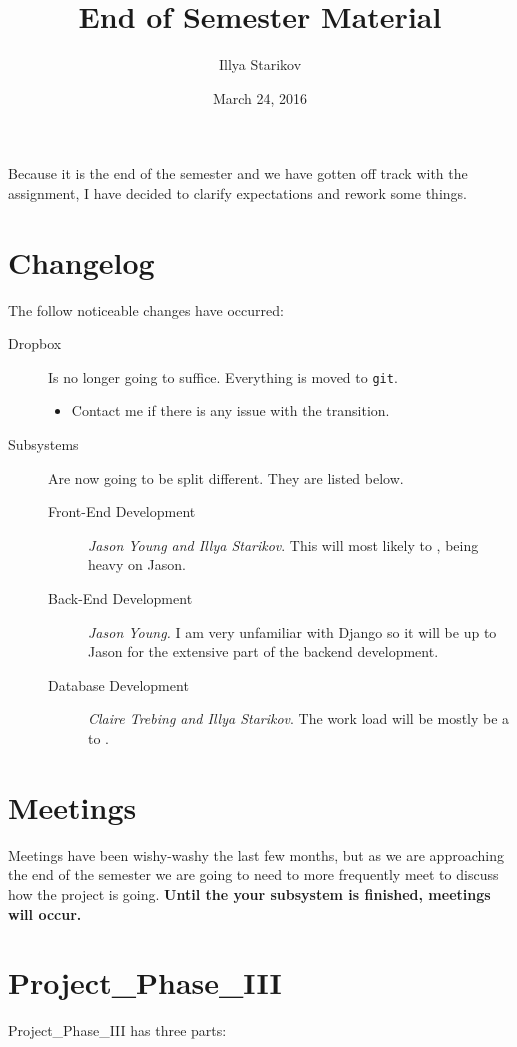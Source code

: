 \documentclass{scrartcl}
\title{End of Semester Material}
\author{Illya Starikov}
\date{March 24, 2016}
\newcommand{\shellcmd}[1]{\texttt{\colorbox{gray!30}{#1}}}
\begin{document}
\maketitle

Because it is the end of the semester and we have gotten off track with the assignment, I have decided to clarify expectations and rework some things.

\section{Changelog}
The follow noticeable changes have occurred:
\begin{description}
    \item [Dropbox] Is no longer going to suffice. Everything is moved to \shellcmd{git}.
    \begin{itemize}
        \item Contact me if there is any issue with the transition.
    \end{itemize}
    \item [Subsystems] Are now going to be split different. They are listed below.
    \begin{description}
        \item[Front-End Development] \textit{Jason Young and Illya Starikov}. This will most likely  to , being heavy on Jason.
        \item[Back-End Development] \textit{Jason Young.} I am very unfamiliar with Django so it will be up to Jason for the extensive part of the backend development.
        \item[Database Development] \textit{Claire Trebing and Illya Starikov}. The work load will be mostly be a  to .
    \end{description}
\end{description}

\section{Meetings}
Meetings have been wishy-washy the last few months, but as we are approaching the end of the semester we are going to need to more frequently meet to discuss how the project is going. \textbf{Until the your subsystem is finished, meetings will occur.}

\section{Project_Phase_III}
Project_Phase_III has three parts:
\end{document}
